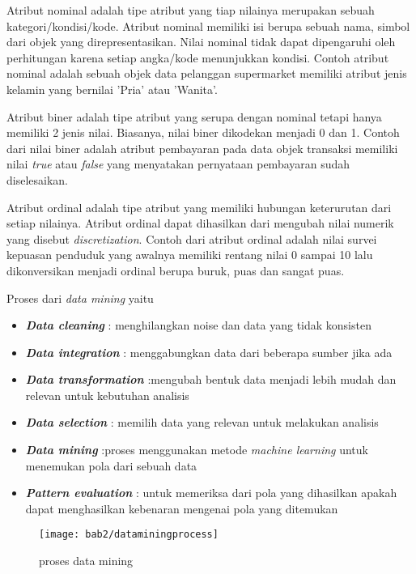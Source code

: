 Atribut nominal adalah tipe atribut yang tiap nilainya merupakan sebuah kategori/kondisi/kode. Atribut nominal memiliki isi berupa sebuah nama, simbol dari objek yang direpresentasikan. Nilai nominal tidak dapat dipengaruhi oleh perhitungan karena setiap angka/kode menunjukkan kondisi. Contoh atribut nominal adalah sebuah objek data pelanggan supermarket memiliki atribut jenis kelamin yang bernilai 'Pria' atau 'Wanita'.
 
Atribut biner adalah tipe atribut yang serupa dengan nominal tetapi hanya memiliki 2 jenis nilai. Biasanya, nilai biner dikodekan menjadi 0 dan 1. Contoh dari nilai biner adalah atribut pembayaran pada data objek transaksi memiliki nilai \textit{true} atau \textit{false} yang menyatakan pernyataan pembayaran sudah diselesaikan.

Atribut ordinal adalah tipe atribut yang memiliki hubungan keterurutan dari setiap nilainya. Atribut ordinal dapat dihasilkan dari mengubah nilai numerik yang disebut \textit{discretization}. Contoh dari atribut ordinal adalah nilai survei kepuasan penduduk yang awalnya memiliki rentang nilai 0 sampai 10 lalu dikonversikan menjadi ordinal berupa buruk, puas dan sangat puas.  

\pagebreak

 Proses dari \textit{data mining} yaitu 
\begin{itemize}
\item \textbf{\textit{Data cleaning}} : menghilangkan noise dan data yang tidak konsisten
\item \textbf{\textit{Data integration}} : menggabungkan data dari beberapa sumber jika ada
\item \textbf{\textit{Data transformation}} :mengubah bentuk data menjadi lebih mudah dan relevan untuk kebutuhan analisis
\item \textbf{\textit{Data selection}} : memilih data yang relevan untuk melakukan analisis
\item \textbf{\textit{Data mining}} :proses menggunakan metode \textit{machine learning} untuk menemukan pola dari sebuah data 
\item \textbf{\textit{Pattern evaluation}} : untuk memeriksa dari pola yang dihasilkan apakah dapat menghasilkan kebenaran mengenai pola yang ditemukan
\end{itemize}


\begin{figure}[h!]
	\centering  
	\texttt{[image: bab2/dataminingprocess]}   
	
	\label{fig:dataminingprocess} 	
	\caption{proses data mining}
\end{figure} 

